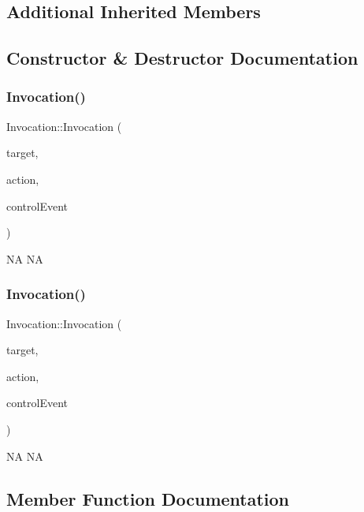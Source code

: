 \subsection*{Additional Inherited Members}


\subsection{Constructor \& Destructor Documentation}
\mbox{\label{classInvocation_ae382b61bb50269810336e5fcca6ffe1f}} 
\subsubsection{\texorpdfstring{Invocation()}{Invocation()}\hspace{0.1cm}{\footnotesize\ttfamily [1/2]}}
{\footnotesize\ttfamily Invocation\+::\+Invocation (\begin{DoxyParamCaption}\item[{\hyperlink{classRef}{Ref} $\ast$}]{target,  }\item[{Control\+::\+Handler}]{action,  }\item[{Control\+::\+Event\+Type}]{control\+Event }\end{DoxyParamCaption})}

NA  NA \mbox{\label{classInvocation_ae382b61bb50269810336e5fcca6ffe1f}} 
\subsubsection{\texorpdfstring{Invocation()}{Invocation()}\hspace{0.1cm}{\footnotesize\ttfamily [2/2]}}
{\footnotesize\ttfamily Invocation\+::\+Invocation (\begin{DoxyParamCaption}\item[{\hyperlink{classRef}{Ref} $\ast$}]{target,  }\item[{Control\+::\+Handler}]{action,  }\item[{Control\+::\+Event\+Type}]{control\+Event }\end{DoxyParamCaption})}

NA  NA 

\subsection{Member Function Documentation}
\mbox{\label{classInvocation_a13c66d6fafe3de660a56b38a21dd0adf}} 
